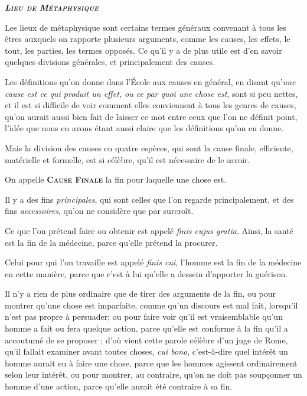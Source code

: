 \begin{center}\emph{\bfseries\scshape Lieu de Métaphysique}\end{center}

Les lieux de métaphysique sont certains termes généraux convenant à tous les êtres auxquels on rapporte plusieurs arguments, comme les causes, les effets, le tout, les parties, les termes opposés. Ce qu'il y a de plus utile est d'en savoir quelques divisions générales, et principalement des causes.

Les définitions qu'on donne dans l'École aux causes en général, en disant qu'\emph{une cause est ce qui produit un effet, ou ce par quoi une chose est}, sont si peu nettes, et il est si difficile de voir comment elles conviennent à tous les genres de causes, qu'on aurait aussi bien fait de laisser ce mot entre ceux que l'on ne définit point, l'idée que nous en avons étant aussi claire que les définitions qu'on en donne.

Mais la division des causes en quatre espèces, qui sont la cause finale, efficiente, matérielle et formelle, est si célèbre, qu'il est nécessaire de le savoir.

\bigbreak
On appelle {\bfseries\scshape Cause Finale} la fin pour laquelle une chose est.

Il y a des fins \emph{principales}, qui sont celles que l'on regarde principalement, et des fins \emph{accessoires}, qu'on ne considère que par surcroît.

Ce que l'on prétend faire ou obtenir est appelé \emph{finis cujus gratia}. Ainsi, la santé est la fin de la médecine, parce qu'elle prétend la procurer.

Celui pour qui l'on travaille est appelé \emph{finis cui}, l'homme est la fin de la médecine en cette manière, parce que c'est à lui qu'elle a dessein d'apporter la guérison.

Il n'y a rien de plus ordinaire que de tirer des arguments de la fin, ou pour montrer qu'une chose est imparfaite, comme qu'un discours est mal fait, lorsqu'il n'est pas propre à persuader; ou pour faire voir qu'il est vraisemblable qu'un homme a fait ou fera quelque action, parce qu'elle est conforme à la fin qu'il a accoutumé de se proposer ; d'où vient cette parole célèbre d'un juge de Rome, qu'il fallait examiner avant toutes choses, \emph{cui bono}, c'est-à-dire quel intérêt un homme aurait eu à faire une chose, parce que les hommes agissent ordinairement selon leur intérêt, ou pour montrer, au contraire, qu'on ne doit pas soupçonner un homme d'une action, parce qu'elle aurait été contraire à sa fin.

